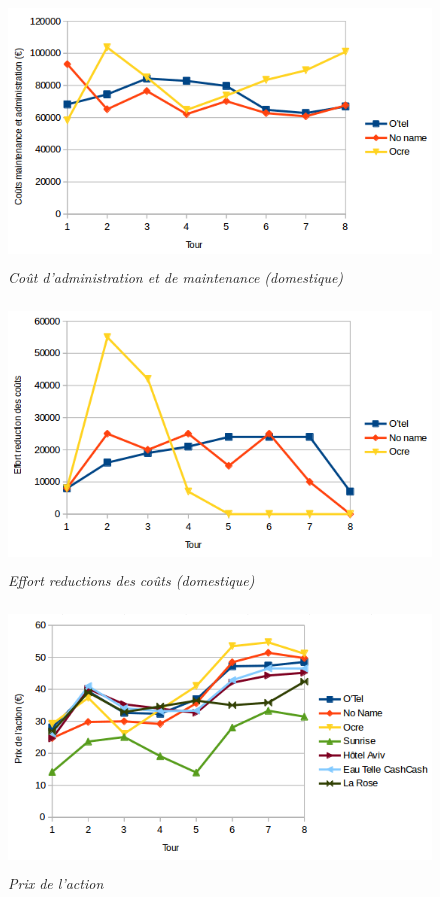 \documentclass[a4paper,10pt]{article}
\begin{document}
    \begin{figure}[!ht]
      \begin{center}
	\includegraphics[height=7cm,keepaspectratio]{./images/cout_administration_et_maintenance.png}
      \end{center}
      \caption{\textit{Coût d'administration et de maintenance (domestique)}}
    \end{figure}

    
    \begin{figure}[!ht]
      \begin{center}
	\includegraphics[height=7cm,keepaspectratio]{./images/effort_reduction_couts.png}
      \end{center}
      \caption{\textit{Effort reductions des coûts (domestique)}}
      \label{effort_reduction_couts}
    \end{figure}
    
    \begin{figure}[!ht]
      \begin{center}
	\includegraphics[height=7cm,keepaspectratio]{./images/action.png}
      \end{center}
      \caption{\textit{Prix de l'action}}
    \end{figure}
        
\end{document}
